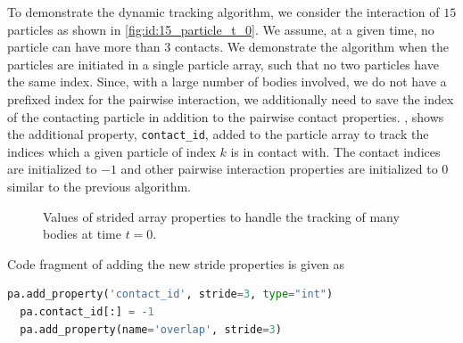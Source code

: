 To demonstrate the dynamic tracking algorithm, we consider the interaction of
$15$ particles as shown in \cref{fig:id:15_particle_t_0}. We assume, at a given
time, no particle can have more than $3$ contacts. We demonstrate the algorithm
when the particles are initiated in a single particle array, such that no two
particles have the same index. Since, with a large number of bodies involved, we
do not have a prefixed index for the pairwise interaction, we additionally need
to save the index of the contacting particle in addition to the pairwise contact
properties. , shows the additional
property, \texttt{contact\_id}, added to the particle array to track the indices which a
given particle of index $k$ is in contact with. The contact indices are
initialized to $-1$ and other pairwise interaction properties are initialized to
$0$ similar to the previous algorithm.
\begin{figure}[!htpb]
  \centering
  \footnotesize
  \caption{Values of strided array properties to handle the tracking of many bodies at time $t=0$.}
\label{fig:many_bodies_initialize_overlap_t_0}
\end{figure}

Code fragment of adding the new stride properties is given as
 \lstset{basicstyle=\footnotesize\ttfamily}
\begin{lstlisting}[label={contact:equations},frame=lines,language=Python,upquote=True]
  pa.add_property('contact_id', stride=3, type="int")
  pa.contact_id[:] = -1
  pa.add_property(name='overlap', stride=3)
\end{lstlisting}

